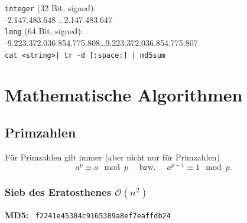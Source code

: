\documentclass[10pt,a4paper,ngerman,oneside,]{article}
\begin{document}
\begin{multicols}{2}
\thispagestyle{fancy}
\tableofcontents
\vfill
{}

\vspace{2em}

		\noindent\texttt{integer} (32 Bit, signed):\\  -2.147.483.648 \dots 2.147.483.647\\
		\texttt{long} (64 Bit, signed): \\-9.223.372.036.854.775.808\dots 9.223.372.036.854.775.807\\
		
\newcommand{\hash}[1]{{\bfseries MD5:} ~\texttt{#1}}
\vspace{1.2em} \texttt{cat <string>| tr -d [:space:] | md5sum}\\


\newpage

\section{Mathematische Algorithmen}
\subsection{Primzahlen}
Für Primzahlen gilt immer (aber nicht nur für Primzahlen)
\[a^p\equiv a\mod p \quad\text{ bzw. }\quad a^{p-1}\equiv 1 \mod p.\]
\subsubsection{Sieb des Eratosthenes $\mathcal O(n^2)$}
\hash{f2241e45384c9165389a8ef7eaffdb24}

\end{multicols}
\end{document}
